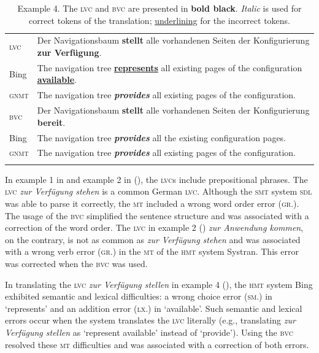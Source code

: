 \documentclass[output=paper]{langsci/langscibook}
\begin{document}
\begin{table}[p]
\caption{Example 4. The \textsc{lvc} and \textsc{bvc} are presented in \textbf{bold black}. \textit{Italic} is used for correct tokens of the translation; \uline{underlining} for the incorrect tokens.\label{marzouk:table5}}
\begin{tabularx}{\textwidth}{lQ}
\lsptoprule
\textsc{lvc}&Der Navigationsbaum \textbf{stellt} alle vorhandenen Seiten der Konfigurierung \textbf{zur Verfügung}.\\
Bing &The navigation tree \uline{\textbf{represents}} all existing pages of the configuration \uline{\textbf{available}}.\\
\textsc{gnmt}&The navigation tree \textit{\textbf{provides}} all existing pages of the configuration.\\
\midrule
\textsc{bvc}&Der Navigationsbaum \textbf{stellt	} alle vorhandenen Seiten der Konfigurierung \textbf{bereit}.\\
Bing&The navigation tree \textbf{\textit{provides}} all the existing configuration pages.\\
\textsc{gnmt}&The navigation tree \textit{\textbf{provides}} all existing pages of the configuration.\\
\lspbottomrule
\end{tabularx}
\end{table}


In example 1 in  and example 2 in (), the \textsc{lvc}s include prepositional phrases. The \textsc{lvc} \textit{zur Verfügung stehen} is a common German \textsc{lvc}. Although the \textsc{smt} system \textsc{sdl} was able to parse it correctly, the \textsc{mt} included a wrong word order error (\textsc{gr}.). The usage of the \textsc{bvc} simplified the sentence structure and was associated with a correction of the word order. The \textsc{lvc} in example 2 () \textit{zur Anwendung kommen}, on the contrary, is not as common as \textit{zur Verfügung stehen} and was associated with a wrong verb error (\textsc{gr}.) in the \textsc{mt} of the \textsc{hmt} system Systran. This error was corrected when the \textsc{bvc} was used.


In translating the \textsc{lvc} \textit{zur Verfügung stellen} in example 4 (), the \textsc{hmt} system Bing exhibited semantic and lexical difficulties: a wrong choice error (\textsc{sm}.) in ‘represents’ and an addition error (\textsc{lx}.) in ‘available’. Such semantic and lexical errors occur when the system translates the \textsc{lvc} literally (e.g., translating \textit{zur Verfügung stellen} as ‘represent available’ instead of ‘provide’). Using the \textsc{bvc} resolved these \textsc{mt} difficulties and was associated with a correction of both errors.
\end{document}
